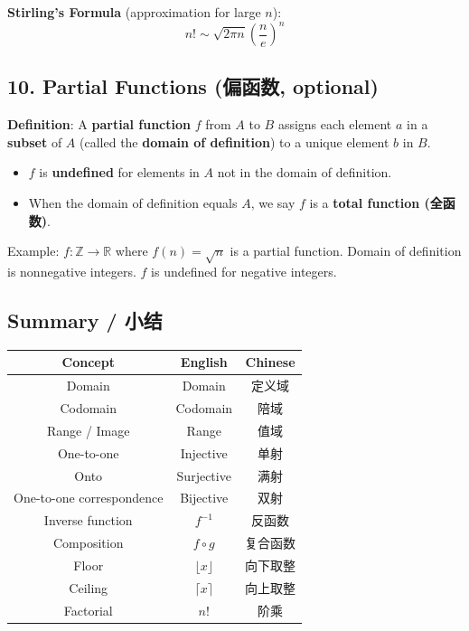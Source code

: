 \documentclass[10pt,a4paper,openany]{ctexbook}
\theoremstyle{definition}
\theoremstyle{remark}
\begin{document}
\textbf{Stirling's Formula} (approximation for large $n$):
\[
n! \sim \sqrt{2\pi n}\left(\frac{n}{e}\right)^n
\]

\vspace{-2pt}

\subsection{10. Partial Functions (偏函数, optional)}

\textbf{Definition}: A \textbf{partial function} $f$ from $A$ to $B$ assigns each element $a$ in a \textbf{subset} of $A$ (called the \textbf{domain of definition}) to a unique element $b$ in $B$.
\begin{itemize}
\item $f$ is \textbf{undefined} for elements in $A$ not in the domain of definition.
\item When the domain of definition equals $A$, we say $f$ is a \textbf{total function (全函数)}.

\end{itemize}

Example: $f: \mathbb{Z} \to \mathbb{R}$ where $f(n) = \sqrt{n}$ is a partial function. Domain of definition is nonnegative integers. $f$ is undefined for negative integers.
\vspace{-2pt}

\subsection{Summary / 小结}

\begin{center}
\begin{tabular}{ccc}
\hline
Concept & English & Chinese \\ \hline
Domain & Domain & 定义域 \\
Codomain & Codomain & 陪域 \\
Range / Image & Range & 值域 \\
One-to-one & Injective & 单射 \\
Onto & Surjective & 满射 \\
One-to-one correspondence & Bijective & 双射 \\
Inverse function & $f^{-1}$ & 反函数 \\
Composition & $f \circ g$ & 复合函数 \\
Floor & $\lfloor x \rfloor$ & 向下取整 \\
Ceiling & $\lceil x \rceil$ & 向上取整 \\
Factorial & $n!$ & 阶乘 \\
\hline
\end{tabular}

\end{center}
\end{document}
